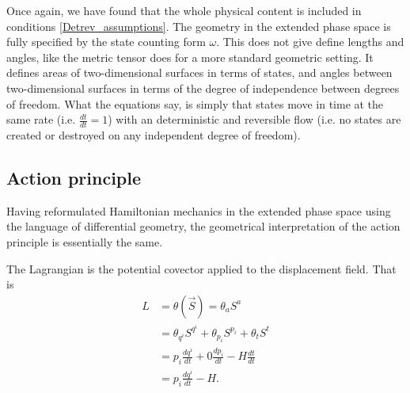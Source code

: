 \documentclass[10pt,twocolumn, nofootinbib]{revtex4-2}
\begin{document}
Once again, we have found that the whole physical content is included in conditions \ref{Detrev_assumptions}. The geometry in the extended phase space is fully specified by the state counting form $\omega$. This does not give define lengths and angles, like the metric tensor does for a more standard geometric setting. It defines areas of two-dimensional surfaces in terms of states, and angles between two-dimensional surfaces in terms of the degree of independence between degrees of freedom. What the equations say, is simply that states move in time at the same rate (i.e. $\frac{dt}{dt} = 1$) with an deterministic and reversible flow (i.e. no states are created or destroyed on any independent degree of freedom).

\subsection{Action principle}
Having reformulated Hamiltonian mechanics in the extended phase space using the language of differential geometry, the geometrical interpretation of the action principle is essentially the same.

The Lagrangian is the potential covector applied to the displacement field. That is
\begin{equation}
\begin{aligned}
L &= \theta(\vec{S}) = \theta_a S^a \\
&= \theta_{q^i} S^{q^i} + \theta_{p_i} S^{p_i} + \theta_{t} S^{t} \\
&= p_i \frac{dq^i}{dt} + 0 \frac{dp_i}{dt} - H \frac{dt}{dt} \\
&= p_i \frac{dq^i}{dt} - H.
\end{aligned}
\end{equation}
\end{document}
